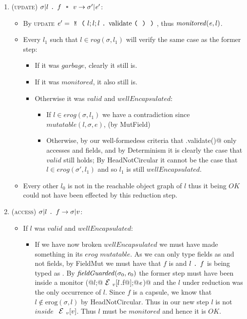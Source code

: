 \begin{enumerate}
\item (\textsc{update}) $\sigma|l\singleDot f\equals v\rightarrow \sigma'|\e'$:
	\begin{itemize}
	  \item By \textsc{update} $\e'=\Kw{M}\oR l;l;l\singleDot\text{validate}\oR\cR\cR$, thus $\mathit{monitored}({\mathit{e}},l)$.
	  \item Every $l_1$ such that $l\in \mathit{rog}(\sigma,l_1)$ will verify the same case as the former step:
	  \begin{itemize}
	  	\item If it was $\mathit{garbage}$, clearly it still is.
	  	\item If it was $\mathit{monitored}$, it also still is.
	    \item Otherwise it was $\mathit{valid}$ and $\mathit{wellEncapsulated}$:
			\begin{itemize}
				\item If $l\in \mathit{erog}(\sigma,l_1)$ we have a contradiction since $mutatable(l, \sigma, e)$, (by MutField)
		    	\item Otherwise, by our well-formedess criteria that \Q@.validate()@ only accesses \Q@imm@ and \Q@capsule@ fields, and by Determinism it is clearly the case that $\mathit{valid}$ still holds;
				By HeadNotCircular it cannot be the case that $l\in \mathit{erog}(\sigma',l_1)$ and so $l_1$ is still $\mathit{wellEncapsulated}$.
		  	\end{itemize}
	  \end{itemize}
	  \item Every other $l_0$ is not in the reachable object graph of $l$
	  thus it being $\mathit{OK}$ could not have been effected by this reduction step.
	\end{itemize}

\item (\textsc{access}) $\sigma|l\singleDot f \rightarrow \sigma|v$:
	\begin{itemize} 
		\item If $l$ was $valid$ and $wellEncapsulated$:
		\begin{itemize}
			\item If we have now broken $wellEncapsulated$ we must have made something in its $erog$  $mutatable$. As we can only type \Q@capsule@ fields as \Q@mut@ and not \Q@imm@ fields, by FieldMut we must have that $f$ is \Q@capsule@ and $l{ \mbox{ {\texttt{.}} } } f$ is being typed as \Q@mut@. By $\mathit{fieldGuarded}(\sigma_0,\e_0)$ the former step must have been inside a monitor \Q@M(@$l$\Q@;@$\ctx_v[l$\Q@.f@$]$\Q@;@${\mathit{e}}$\Q@)@
		    and the $l$ under reduction was the only occurrence of $l$.
		    Since $f$ is a capsule, we know that $l\notin \text{erog}(\sigma,l)$
		    by HeadNotCircular. Thus in our new step $l$ is not $inside$ $\ctx_v[v]$. Thus $l$ must be $monitored$ and hence it is $OK$.
		    

\end{itemize}
\end{itemize}
\end{enumerate}
